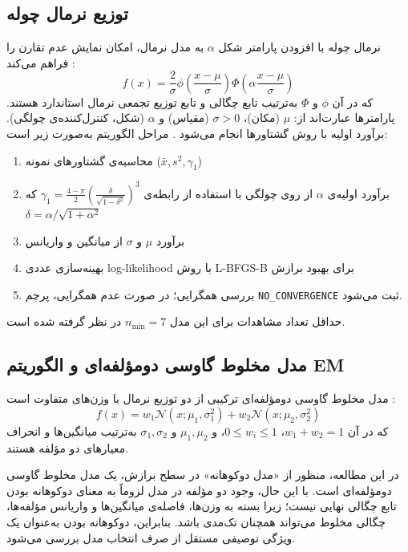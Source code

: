 \documentclass[12pt,a4paper,twocolumn]{article}
\begin{document}
\subsection{توزیع نرمال چوله}
نرمال چوله با افزودن پارامتر شکل $\alpha$ به مدل نرمال، امکان نمایش عدم تقارن را فراهم می‌کند \cite{azzalini1985}:
\begin{equation}
f(x) = \frac{2}{\sigma}\phi\left( \frac{x - \mu}{\sigma} \right)\Phi\left( \alpha\frac{x - \mu}{\sigma} \right)
\end{equation}
که در آن $\phi$ و $\Phi$ به‌ترتیب تابع چگالی و تابع توزیع تجمعی نرمال استاندارد هستند. پارامترها عبارت‌اند از: $\mu$ (مکان)، $\sigma>0$ (مقیاس) و $\alpha$ (شکل، کنترل‌کننده‌ی چولگی). برآورد اولیه با روش گشتاورها انجام می‌شود \cite{hosking1990}. مراحل الگوریتم به‌صورت زیر است:
\begin{enumerate}
\item محاسبه‌ی گشتاورهای نمونه ($\bar{x}, s^2, \gamma_1$)
\item برآورد اولیه‌ی $\alpha$ از روی چولگی با استفاده از رابطه‌ی $\gamma_1 = \frac{4-\pi}{2} \left( \frac{\delta}{\sqrt{1-\delta^2}} \right)^3$ که $\delta = \alpha/\sqrt{1+\alpha^2}$
\item برآورد $\mu$ و $\sigma$ از میانگین و واریانس
\item بهینه‌سازی عددی log-likelihood با روش L-BFGS-B برای بهبود برازش
\item بررسی همگرایی؛ در صورت عدم همگرایی، پرچم \texttt{NO\_CONVERGENCE} ثبت می‌شود.
\end{enumerate}
حداقل تعداد مشاهدات برای این مدل $n_{\min}=7$ در نظر گرفته شده است.

\subsection{مدل مخلوط گاوسی دومؤلفه‌ای و الگوریتم EM}
مدل مخلوط گاوسی دومؤلفه‌ای ترکیبی از دو توزیع نرمال با وزن‌های متفاوت است \cite{mclachlan2000}:
\begin{equation}
f(x) = w_{1}\mathcal{N}(x;\mu_{1},\sigma_{1}^{2}) + w_{2}\mathcal{N}(x;\mu_{2},\sigma_{2}^{2})
\end{equation}
که در آن $w_1+w_2=1$، $0\le w_i\le 1$، و $\mu_1,\mu_2$ و $\sigma_1,\sigma_2$ به‌ترتیب میانگین‌ها و انحراف معیارهای دو مؤلفه هستند.

در این مطالعه، منظور از «مدل دوکوهانه» در سطح برازش، یک مدل مخلوط گاوسی دومؤلفه‌ای است. با این حال، وجود دو مؤلفه در مدل لزوماً به معنای دوکوهانه بودن تابع چگالی نهایی نیست؛ زیرا بسته به وزن‌ها، فاصله‌ی میانگین‌ها و واریانس مؤلفه‌ها، چگالی مخلوط می‌تواند همچنان تک‌مدی باشد. بنابراین، دوکوهانه بودن به‌عنوان یک ویژگی توصیفی مستقل از صرف انتخاب مدل بررسی می‌شود.
\end{document}
